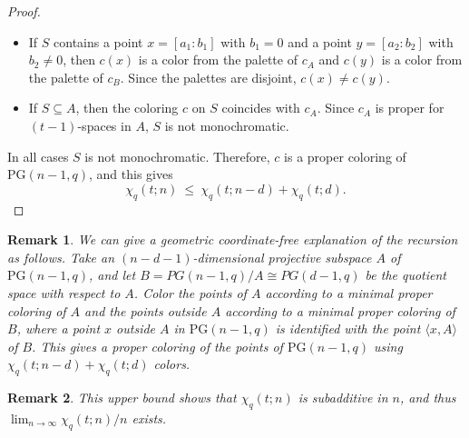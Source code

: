 \documentclass[11pt]{article}
\theoremstyle{plain}
\newtheorem{remark}{Remark}
\newcommand{\PG}{\mathrm{PG}}
\begin{document}
\begin{proof}
\begin{itemize}
    \item  If $S$ contains a point $x=[a_1:b_1]$ with $b_1=0$ and a point $y=[a_2:b_2]$ with $b_2\ne 0$, then $c(x)$ is a color from the palette of $c_A$ and $c(y)$ is a color from the palette of $c_B$.
    Since the palettes are disjoint, $c(x)\neq c(y)$.
    
    \item  If $S\subseteq A$, then the coloring $c$ on $S$ coincides with $c_A$.
    Since $c_A$ is proper for $(t-1)$-spaces in $A$, $S$ is not monochromatic.
    
\end{itemize}

In all cases $S$ is not monochromatic.
Therefore, $c$ is a proper coloring of $\PG(n-1,q)$, and this gives
\[
\chi_q(t;n)\ \le\ \chi_q(t;n-d)+\chi_q(t;d).
\]
\end{proof}

\begin{remark}
    We can give a geometric coordinate-free explanation of the recursion as follows.
    Take an $(n - d - 1)$-dimensional projective subspace $A$ of $\PG(n - 1, q)$, and let $B = PG(n - 1, q)/A \cong PG(d - 1, q)$ be the quotient space with respect to $A$. 
    Color the points of $A$ according to a minimal proper coloring of $A$ and the points outside $A$ according to a minimal proper coloring of $B$, where a point $x$ outside $A$ in $\PG(n - 1, q)$ is identified with the point $\langle x, A \rangle$ of $B$. 
    This gives a proper coloring of the points of $\mathrm{PG}(n - 1, q)$ using $\chi_q(t; n - d) + \chi_q(t; d)$ colors. 
\end{remark}

\begin{remark}
    This upper bound shows that $\chi_q(t; n)$ is subadditive in $n$, and thus $\lim_{n \rightarrow \infty} \chi_q(t; n)/n$ exists. 
\end{remark}
\end{document}
